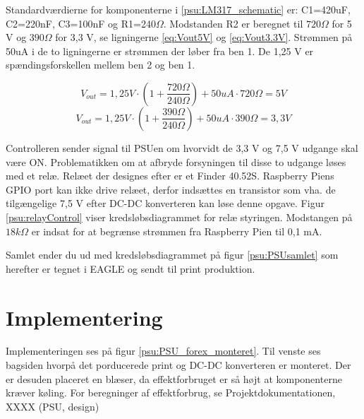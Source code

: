 
Standardværdierne for komponenterne i \ref{psu:LM317_schematic} er: C1=420uF, C2=220nF, C3=100nF og R1=240$\Omega$. Modstanden R2 er beregnet til $720\Omega$ for 5 V og $390\Omega$ for 3,3 V, se ligningerne \ref{eq:Vout5V} og \ref{eq:Vout3.3V}. Strømmen på 50uA i de to ligningerne er strømmen der løber fra ben 1. De 1,25 V er spændingsforskellen mellem ben 2 og ben 1. 

\begin{equation} 
{ V }_{ out }=1,25V\cdot \left( 1+\frac { 720\Omega  }{ 240\Omega  }  \right) +50uA\cdot 720\Omega =5V
\label{eq:Vout5V}
\end{equation}
\begin{equation} 
{ V }_{ out }=1,25V\cdot \left( 1+\frac { 390\Omega  }{ 240\Omega  }  \right) +50uA\cdot 390\Omega =3,3V
\label{eq:Vout3.3V}
\end{equation}

Controlleren sender signal til PSUen om hvorvidt de 3,3 V og 7,5 V udgange skal være ON. Problematikken om at afbryde forsyningen til disse to udgange løses med et relæ. Relæet der designes efter er et Finder 40.52S. Raspberry Piens GPIO port kan ikke drive relæet, derfor indsættes en transistor som vha. de tilgængelige 7,5 V efter DC-DC konverteren kan løse denne opgave. Figur \ref{psu:relayControl} viser kredsløbsdiagrammet for relæ styringen. Modstangen på $18k\Omega$ er indsat for at begrænse strømmen fra Raspberry Pien til 0,1 mA. 


Samlet ender du ud med kredsløbsdiagrammet på figur \ref{psu:PSUsamlet} som herefter er tegnet i EAGLE og sendt til print produktion. 

\section{Implementering}

Implementeringen ses på figur \ref{psu:PSU_forex_monteret}. Til venste ses bagsiden hvorpå det porducerede print og DC-DC konverteren er monteret. Der er desuden placeret en blæser, da effektforbruget er så højt at komponenterne kræver køling. For beregninger af effektforbrug, se Projektdokumentationen, XXXX (PSU, design)



